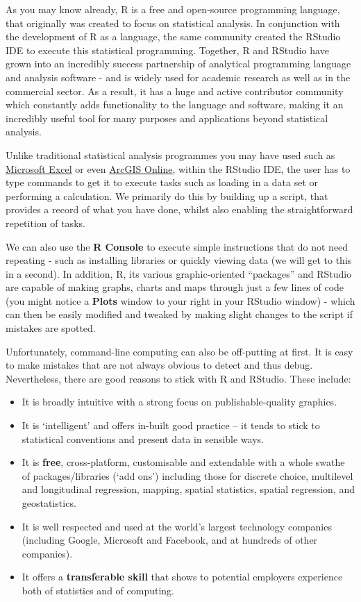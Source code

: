 \documentclass[
]{book}
\providecommand{\tightlist}{%
  \setlength{\itemsep}{0pt}\setlength{\parskip}{0pt}}
\begin{document}
As you may know already, R is a free and open-source programming language, that originally was created to focus on statistical analysis. In conjunction with the development of R as a language, the same community created the RStudio IDE to execute this statistical programming. Together, R and RStudio have grown into an incredibly success partnership of analytical programming language and analysis software - and is widely used for academic research as well as in the commercial sector. As a result, it has a huge and active contributor community which constantly adds functionality to the language and software, making it an incredibly useful tool for many purposes and applications beyond statistical analysis.

Unlike traditional statistical analysis programmes you may have used such as \href{https://www.microsoft.com/en-us/microsoft-365/excel}{Microsoft Excel} or even \href{https://www.arcgis.com/home/index.html}{ArcGIS Online}, within the RStudio IDE, the user has to type commands to get it to execute tasks such as loading in a data set or performing a calculation. We primarily do this by building up a script, that provides a record of what you have done, whilst also enabling the straightforward repetition of tasks.

We can also use the \textbf{R Console} to execute simple instructions that do not need repeating - such as installing libraries or quickly viewing data (we will get to this in a second). In addition, R, its various graphic-oriented ``packages'' and RStudio are capable of making graphs, charts and maps through just a few lines of code (you might notice a \textbf{Plots} window to your right in your RStudio window) - which can then be easily modified and tweaked by making slight changes to the script if mistakes are spotted.

Unfortunately, command-line computing can also be off-putting at first. It is easy to make mistakes that are not always obvious to detect and thus debug. Nevertheless, there are good reasons to stick with R and RStudio. These include:

\begin{itemize}
\tightlist
\item
  It is broadly intuitive with a strong focus on publishable-quality graphics.
\item
  It is `intelligent' and offers in-built good practice -- it tends to stick to statistical conventions and present data in sensible ways.
\item
  It is \textbf{free}, cross-platform, customisable and extendable with a whole swathe of packages/libraries (`add ons') including those for discrete choice, multilevel and longitudinal regression, mapping, spatial statistics, spatial regression, and geostatistics.
\item
  It is well respected and used at the world's largest technology companies (including Google, Microsoft and Facebook, and at hundreds of other companies).
\item
  It offers a \textbf{transferable skill} that shows to potential employers experience both of statistics and of computing.
\end{itemize}
\end{document}
